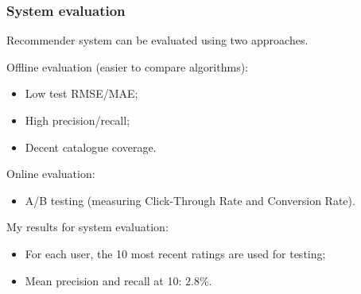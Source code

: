 \documentclass[xcolor = {table}]{beamer}
\begin{document}
  \begin{frame}
    \frametitle{System evaluation}

    Recommender system can be evaluated using two approaches.

    \vspace{1em}

    Offline evaluation (easier to compare algorithms):
    \begin{itemize}
      \item Low test RMSE/MAE;
      \item High precision/recall;
      \item Decent catalogue coverage.
    \end{itemize}

    \vspace{0.5em}

    Online evaluation:
    \begin{itemize}
      \item A/B testing (measuring Click-Through Rate and Conversion Rate).
    \end{itemize}

    \vspace{1em}

    \pause

    My results for system evaluation:

    \begin{itemize}
      \item For each user, the 10 most recent ratings are used for testing;
      \item Mean precision and recall at 10: $2.8\%$.
    \end{itemize}

  \end{frame}
\end{document}
